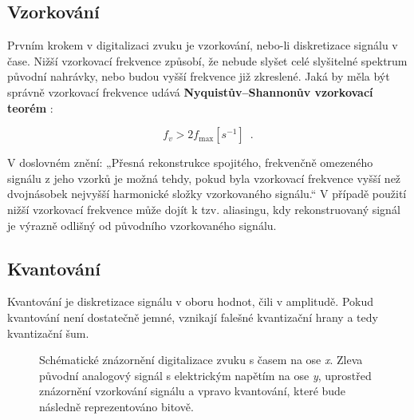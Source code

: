 \documentclass[thesis=B, czech]{FITthesis}[2019/03/06]
\begin{document}




\pagebreak


\subsection*{Vzorkování}

Prvním krokem v digitalizaci zvuku je vzorkování, nebo-li diskretizace signálu v čase. Nižší vzorkovací frekvence způsobí, že nebude slyšet celé slyšitelné spektrum původní nahrávky, nebo budou vyšší frekvence již zkreslené. Jaká by měla být správně vzorkovací frekvence udává \textbf{Nyquistův–Shannonův vzorkovací teorém} \cite{nyquist}:

\begin{equation} \label{eq:1}
    {\displaystyle f_{v}>2f_{\max }\left[s^{-1}\right]} \enspace .
\end{equation}

V doslovném znění: „Přesná rekonstrukce spojitého, frekvenčně omezeného signálu z jeho vzorků je možná tehdy, pokud byla vzorkovací frekvence vyšší než dvojnásobek nejvyšší harmonické složky vzorkovaného signálu.“ V případě použití nižší vzorkovací frekvence může dojít k tzv. aliasingu, kdy rekonstruovaný signál je výrazně odlišný od původního vzorkovaného signálu.

\subsection*{Kvantování}

Kvantování je diskretizace signálu v oboru hodnot, čili v amplitudě. Pokud kvantování není dostatečně jemné, vznikají falešné kvantizační hrany a tedy kvantizační šum.

\begin{figure}[h]
\def\svgwidth{0.8\textwidth}
  \captionsetup{justification=centering}
    \centering
    
        \caption[Digitalizace signálu.]{ 
        Schématické znázornění digitalizace zvuku s časem na ose \textit{x}. Zleva původní analogový signál s elektrickým napětím na ose\textit{ y}, uprostřed znázornění vzorkování signálu a vpravo kvantování, které bude následně reprezentováno bitově.}
    \label{fig:digitalization}
\end{figure}
\end{document}
